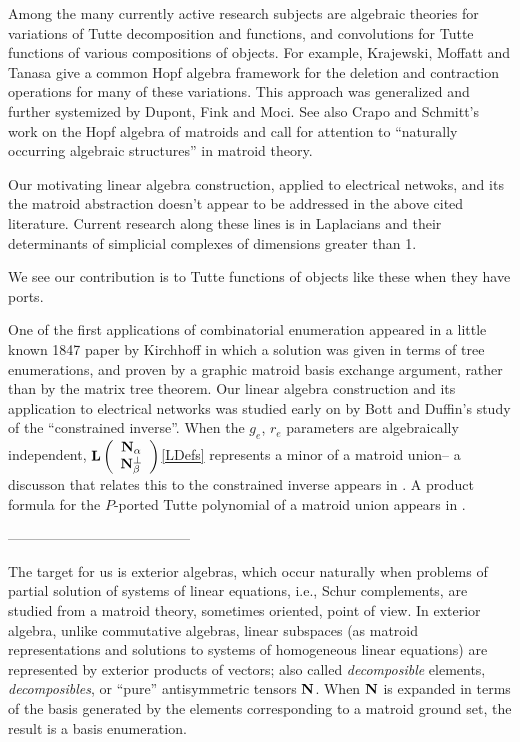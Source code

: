 
Among the many currently active research subjects
are algebraic theories for variations of
Tutte decomposition and functions, and convolutions for
Tutte functions of various compositions of objects.  
For example,
Krajewski, Moffatt and Tanasa give a common Hopf algebra framework
for the deletion and contraction operations for many of
these variations\cite{MoffatHopfTutte}.
This approach was generalized and further systemized by
Dupont, Fink and Moci\cite{ALCO_2018__1_5_603_0}.
See also Crapo and Schmitt's work
on the Hopf algebra of matroids and call
for attention to ``naturally occurring algebraic
structures'' in matroid theory\cite{CRAPO20051066}.  

Our motivating linear algebra construction, applied to
electrical netwoks, and its the matroid
abstraction
doesn't appear to be addressed in the above cited literature.
Current research along these lines is in Laplacians and their
determinants of simplicial complexes of dimensions greater than 1.

We see our contribution is to Tutte functions of objects like these
when they have ports.  


One of the
first applications of combinatorial enumeration
appeared in a little known 1847 paper by Kirchhoff\cite{Kirchhoff}
in which a solution was given in terms of tree enumerations,
and proven by a graphic matroid basis exchange argument, rather
than by the matrix tree theorem.
Our linear algebra construction and its application to
electrical networks was studied early on by
Bott and Duffin's\cite{BottDuffinAlgNetworks} study of the ``constrained
inverse''.  When the $g_e$, $r_e$ parameters are algebraically independent,
$\mathbf{L}\left( \begin{array}{c} {\ensuremath{\mathbf{N}_{\alpha}}}\\ {\mathbf{N}_{\beta}^{\perp}} \end{array} \right)$\ref{LDefs} represents a minor of a matroid union--
a discusson that relates this to the constrained
inverse appears in \cite{sdcBDIMatroid}.  A product formula for
the $P$-ported Tutte polynomial of a matroid union appears in
\cite{sdcPorted}.  

---------------------------------------
\newpage

The target for us
is exterior algebras, which occur naturally when problems of
partial solution of systems of linear equations\cite{ExteriorAlgInLinalgRef},
i.e., Schur complements,
are studied from a matroid theory, sometimes oriented, point of view.
In exterior algebra, unlike commutative algebras,
linear subspaces (as matroid representations and
solutions to systems of homogeneous linear equations)
are represented by exterior products of vectors; also called
\emph{decomposible} elements, \emph{decomposibles},
or ``pure'' antisymmetric tensors $\mathbf{N}$.
When $\mathbf{N}$ is expanded in terms of the basis
generated by the elements corresponding to a matroid
ground set, the result is a basis enumeration.


